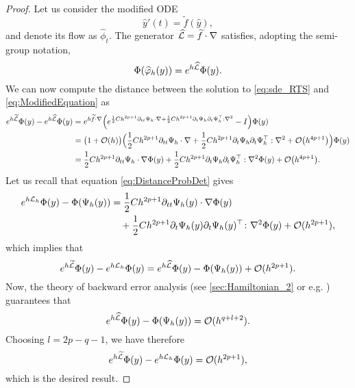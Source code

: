 \documentclass[10pt]{article}
\begin{document}
\begin{proof} Let us consider the modified ODE 
	\begin{equation}\label{eq:ModifiedEquation}
		\hat y'(t) = \tilde f(\hat y), 
	\end{equation}
	and denote its flow as $\hat \phi_t$. The generator $\widehat {\mathcal{L}} = \widetilde f \cdot \nabla$ satisfies, adopting the semi-group notation,
	\begin{equation}
		\Phi(\widehat {\varphi}_h(y)) = e^{h\widehat {\mathcal{L}}}\Phi(y).
	\end{equation} 
	We can now compute the distance between the solution to \eqref{eq:sde_RTS} and \eqref{eq:ModifiedEquation} as
	\begin{equation}
	\begin{aligned}
		e^{h \widetilde {\mathcal{L}}}\Phi(y)- e^{h \widehat {\mathcal{L}}}\Phi(y) &= e^{h\widetilde f \cdot \nabla}\Big(e^{\frac{1}{2}Ch^{{2p+1}}\partial_{tt}\Psi_h \cdot \nabla + \frac{1}{2}Ch^{{2p+1}}\partial_t \Psi_h \partial_t \Psi_h^\top : \nabla^2} - I\Big) \Phi(y)\\
		&= \big(1 + \mathcal{O}(h)\big)\Big(\frac{1}{2}Ch^{{2p+1}}\partial_{tt}\Psi_h \cdot \nabla + \frac{1}{2}Ch^{{2p+1}}\partial_t \Psi_h \partial_t \Psi_h^\top : \nabla^2 + \mathcal{O}\big(h^{{4p+1}}\big)\Big)\Phi(y) \\
		&= \frac{1}{2}Ch^{2p+1}\partial_{tt}\Psi_h \cdot \nabla\Phi(y) + \frac{1}{2}Ch^{2p+1}\partial_t \Psi_h \partial_t \Psi_h^\top : \nabla^2 \Phi(y) + \mathcal{O}\big(h^{{4p+1}}\big).
	\end{aligned}
	\end{equation}
	Let us recall that equation \eqref{eq:DistanceProbDet} gives
	\begin{equation}
	\begin{aligned}
		e^{h\mathcal{L}_h}\Phi(y) - \Phi(\Psi_h(y)) &= \frac{1}{2} Ch^{2p+1}\partial_{tt}\Psi_h(y) \cdot \nabla\Phi(y)\\
		&\quad +\frac{1}{2}Ch^{2p+1}\partial_t \Psi_h(y) \partial_t \Psi_h(y)^\top  \colon \nabla^2\Phi(y) + \mathcal{O}(h^{2p+1}),
	\end{aligned}
	\end{equation}
	which implies that
	\begin{equation}
		e^{h\widetilde {\mathcal{L}}}\Phi(y)- e^{h\mathcal{L}_h}\Phi(y) = e^{h\widehat {\mathcal{L}}}\Phi(y) - \Phi(\Psi_h(y)) + \mathcal{O}(h^{2p+1}).
	\end{equation}	
	Now, the theory of backward error analysis (see \cref{sec:Hamiltonian_2} or e.g. \cite[Chapter IX]{HLW06}) guarantees that
	\begin{equation}
		e^{h\widehat {\mathcal{L}}}\Phi(y) - \Phi(\Psi_h(y)) = \mathcal{O}(h^{q+l+2}).
	\end{equation}
	Choosing $l = 2p - q - 1$, we have therefore
	\begin{equation}
		e^{h\widetilde {\mathcal{L}}}\Phi(y)- e^{h\mathcal{L}_h}\Phi(y) = \mathcal{O}(h^{2p+1}),
	\end{equation}
	which is the desired result.
\end{proof}
\end{document}
